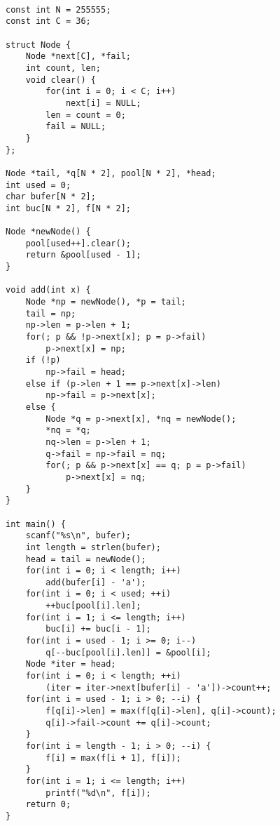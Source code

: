 \begin{lstlisting}

const int N = 255555;
const int C = 36;

struct Node {
	Node *next[C], *fail;
	int count, len;
	void clear() {
		for(int i = 0; i < C; i++)
			next[i] = NULL;
		len = count = 0;
		fail = NULL;
	}
};

Node *tail, *q[N * 2], pool[N * 2], *head;
int used = 0;
char bufer[N * 2];
int buc[N * 2], f[N * 2];

Node *newNode() {
	pool[used++].clear();
	return &pool[used - 1];
}

void add(int x) {
	Node *np = newNode(), *p = tail;
	tail = np;
	np->len = p->len + 1;
	for(; p && !p->next[x]; p = p->fail)
		p->next[x] = np;
	if (!p)
		np->fail = head;
	else if (p->len + 1 == p->next[x]->len)
		np->fail = p->next[x];
	else {
		Node *q = p->next[x], *nq = newNode();
		*nq = *q; 
		nq->len = p->len + 1;
		q->fail = np->fail = nq;
		for(; p && p->next[x] == q; p = p->fail)
			p->next[x] = nq;
	}
}

int main() {
	scanf("%s\n", bufer);
	int length = strlen(bufer);
	head = tail = newNode();
	for(int i = 0; i < length; i++)
		add(bufer[i] - 'a');
	for(int i = 0; i < used; ++i) 
		++buc[pool[i].len];
	for(int i = 1; i <= length; i++)
		buc[i] += buc[i - 1];
	for(int i = used - 1; i >= 0; i--)
		q[--buc[pool[i].len]] = &pool[i];
	Node *iter = head;
	for(int i = 0; i < length; ++i)
		(iter = iter->next[bufer[i] - 'a'])->count++;
	for(int i = used - 1; i > 0; --i) {
		f[q[i]->len] = max(f[q[i]->len], q[i]->count);
		q[i]->fail->count += q[i]->count;
	}
	for(int i = length - 1; i > 0; --i) {
		f[i] = max(f[i + 1], f[i]);
	}
	for(int i = 1; i <= length; i++)
		printf("%d\n", f[i]);
	return 0;
}
	\end{lstlisting}
